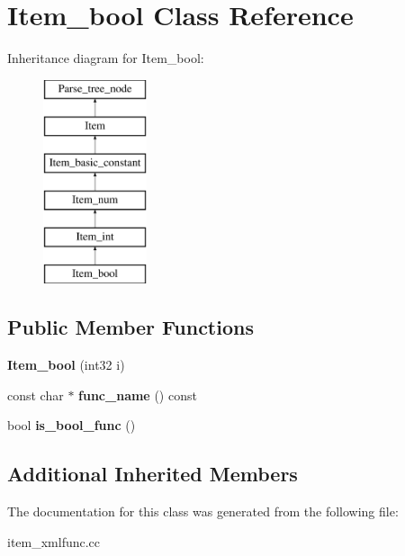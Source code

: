 \hypertarget{classItem__bool}{}\section{Item\+\_\+bool Class Reference}
\label{classItem__bool}
Inheritance diagram for Item\+\_\+bool\+:\begin{figure}[H]
\begin{center}
\leavevmode
\includegraphics[height=6.000000cm]{classItem__bool}
\end{center}
\end{figure}
\subsection*{Public Member Functions}
\begin{DoxyCompactItemize}
\item 
\mbox{\label{classItem__bool_a2dbdc7f299f0e9e061ae5aa2a5951c18}} 
{\bfseries Item\+\_\+bool} (int32 i)
\item 
\mbox{\label{classItem__bool_a89434bfa116d47aaddfcb3a40e2c570f}} 
const char $\ast$ {\bfseries func\+\_\+name} () const
\item 
\mbox{\label{classItem__bool_abe07d76e4f852d334ebbff7a693cc188}} 
bool {\bfseries is\+\_\+bool\+\_\+func} ()
\end{DoxyCompactItemize}
\subsection*{Additional Inherited Members}


The documentation for this class was generated from the following file\+:\begin{DoxyCompactItemize}
\item 
item\+\_\+xmlfunc.\+cc\end{DoxyCompactItemize}
